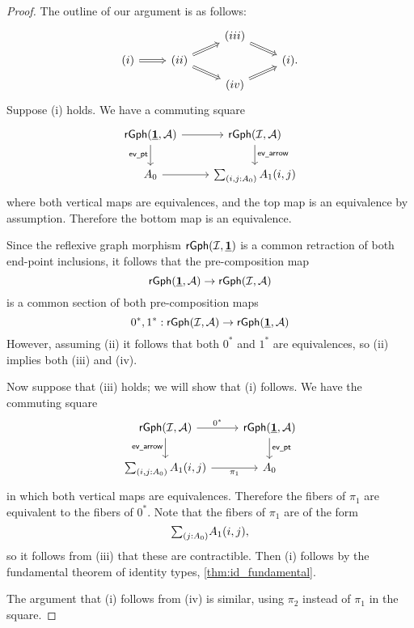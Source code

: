 \begin{proof}
The outline of our argument is as follows:
\begin{equation*}
\begin{tikzcd}[row sep=tiny]
& & (iii) \arrow[dr,Rightarrow] \\
(i) \arrow[r,Rightarrow] & (ii) \arrow[ur,Rightarrow] \arrow[dr,Rightarrow] & & (i). \\
& & (iv) \arrow[ur,Rightarrow]
\end{tikzcd}
\end{equation*}
Suppose (i) holds. We have a commuting square
\begin{equation*}
\begin{tikzcd}
\mathsf{rGph}(\unit,\mathcal{A}) \arrow[d,swap,"\mathsf{ev\usc{}pt}"] \arrow[r] & \mathsf{rGph}(\mathcal{I},\mathcal{A}) \arrow[d,"\mathsf{ev\usc{}arrow}"] \\
\pts{A} \arrow[r] & \sm{i,j:\pts{A}}\edg{A}(i,j)
\end{tikzcd}
\end{equation*}
where both vertical maps are equivalences, and the top map is an equivalence by assumption. Therefore the bottom map is an equivalence.

Since the reflexive graph morphism $\mathsf{rGph}(\mathcal{I},\underline{\mathbf{1}})$ is a common retraction of both end-point inclusions, it follows that the pre-composition map
\begin{equation*}
\mathsf{rGph}(\underline{\mathbf{1}},\mathcal{A}) \to \mathsf{rGph}(\mathcal{I},\mathcal{A})
\end{equation*}
is a common section of both pre-composition maps
\begin{equation*}
0^\ast,1^\ast:\mathsf{rGph}(\mathcal{I},\mathcal{A})\to \mathsf{rGph}(\underline{\mathbf{1}},\mathcal{A})
\end{equation*}
However, assuming (ii) it follows that both $0^\ast$ and $1^\ast$ are equivalences, so (ii) implies both (iii) and (iv).

Now suppose that (iii) holds; we will show that (i) follows. We have the commuting square
\begin{equation*}
\begin{tikzcd}
\mathsf{rGph}(\mathcal{I},\mathcal{A}) \arrow[d,swap,"\mathsf{ev\usc{}arrow}"] \arrow[r,"0^\ast"] & \mathsf{rGph}(\unit,\mathcal{A}) \arrow[d,"\mathsf{ev\usc{}pt}"] \\
\sm{i,j:\pts{A}}\edg{A}(i,j) \arrow[r,swap,"\pi_1"] & \pts{A}
\end{tikzcd}
\end{equation*}
in which both vertical maps are equivalences. Therefore the fibers of $\pi_1$ are equivalent to the fibers of $0^\ast$. Note that the fibers of $\pi_1$ are of the form
\begin{equation*}
\sm{j:\pts{A}}\edg{A}(i,j),
\end{equation*}
so it follows from (iii) that these are contractible. Then (i) follows by the fundamental theorem of identity types, \cref{thm:id_fundamental}.

The argument that (i) follows from (iv) is similar, using $\pi_2$ instead of $\pi_1$ in the square.
\end{proof}

